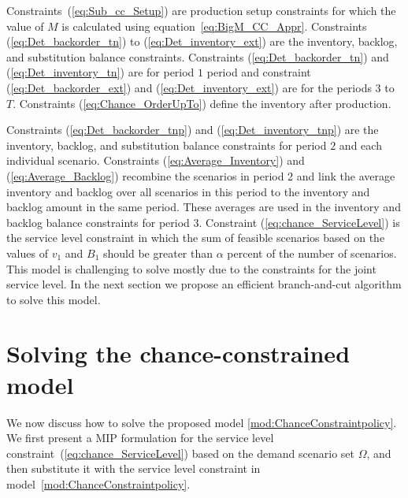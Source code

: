 \documentclass[10pt]{article}
\newcommand{\ti}{t} %
\newcommand{\TI}{\mathcal{T}}
\newcommand{\Ti}{T}
\newcommand{\ka}{k} %
\newcommand{\KA}{\mathcal{K}}
\newcommand{\jey}{j} %
\newcommand{\Vi}{v} %
\newcommand{\m}{\omega} %
\newcommand{\EM}{\Omega} %
\newcommand{\Csub}{\mathcal{K}^+_k}
\newcommand{\cred}{\color{red!65!black}}
\begin{document}
Constraints~(\ref{eq:Sub_cc_Setup}) are production setup constraints for which the value of $M$ is calculated using equation~\ref{eq:BigM_CC_Appr}. Constraints (\ref{eq:Det_backorder_tn}) to (\ref{eq:Det_inventory_ext}) are the inventory, backlog, and substitution balance constraints.
Constraints (\ref{eq:Det_backorder_tn}) and (\ref{eq:Det_inventory_tn}) are for period $1$ period and constraint (\ref{eq:Det_backorder_ext}) and (\ref{eq:Det_inventory_ext}) are for the periods $3$ to $\Ti$.  Constraints (\ref{eq:Chance_OrderUpTo}) define the inventory after production.
 
 
 
 {\cred{
\begin{alignat}{2}
  &  M_{\ti \ka} = \hat{B}_{0 \ka}+  \sum_{\jey \in  \Csub}\left( {\hat{D}}_{\ti \jey} + \max_{\m \in \EM} {D}^{\m}_{2 \jey}+ \sum_{\ti =3}^\Ti \mathbb{E}[{D}_{\ti \jey}]\right)  &&\qquad \forall \ti \in \TI ,\forall \ka \in \KA   
  \label{eq:BigM_CC_Appr}
  \end{alignat}}}
 
Constraints (\ref{eq:Det_backorder_tnp}) and (\ref{eq:Det_inventory_tnp}) are the inventory, backlog, and substitution balance constraints for period $2$ and each individual scenario.  
Constraints (\ref{eq:Average_Inventory}) and (\ref{eq:Average_Backlog}) recombine the scenarios in period 2 and link the average inventory and backlog over all scenarios in this period to the inventory and backlog amount in the same period. These averages are used in the inventory and backlog balance constraints for period $3$.
Constraint (\ref{eq:chance_ServiceLevel}) is the service level constraint in which the sum of feasible scenarios based on the values of $\Vi_1$ and $B_1$ should be greater than $\alpha$ percent of the number of scenarios. This model is challenging to solve mostly due to the constraints for the joint service level. In the next section we propose an efficient branch-and-cut algorithm to solve this model.\\


    
 
  
  \section{Solving the chance-constrained model}
  
  We now discuss how to solve the proposed model \eqref{mod:ChanceConstraintpolicy}.
We first present a MIP formulation for the service level constraint~(\ref{eq:chance_ServiceLevel}) based on the demand scenario set $\EM$, and then substitute it with the service level constraint in model~\eqref{mod:ChanceConstraintpolicy}. 
  
\end{document}
